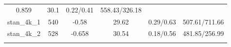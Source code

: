 \documentclass[]{article}
\begin{document}
\begin{longtable}[]{@{}cccccc@{}}
\begin{minipage}[t]{0.12\columnwidth}
0.859\strut
\end{minipage} & \begin{minipage}[t]{0.14\columnwidth}\centering\strut
30.1\strut
\end{minipage} & \begin{minipage}[t]{0.17\columnwidth}\centering\strut
0.22/0.41\strut
\end{minipage} & \begin{minipage}[t]{0.22\columnwidth}\centering\strut
558.43/326.18\strut
\end{minipage}\tabularnewline
\begin{minipage}[t]{0.12\columnwidth}\centering\strut
stan\_4k\_1\strut
\end{minipage} & \begin{minipage}[t]{0.07\columnwidth}\centering\strut
540\strut
\end{minipage} & \begin{minipage}[t]{0.12\columnwidth}\centering\strut
-0.58\strut
\end{minipage} & \begin{minipage}[t]{0.14\columnwidth}\centering\strut
29.62\strut
\end{minipage} & \begin{minipage}[t]{0.17\columnwidth}\centering\strut
0.29/0.63\strut
\end{minipage} & \begin{minipage}[t]{0.22\columnwidth}\centering\strut
507.61/711.66\strut
\end{minipage}\tabularnewline
\begin{minipage}[t]{0.12\columnwidth}\centering\strut
stan\_4k\_2\strut
\end{minipage} & \begin{minipage}[t]{0.07\columnwidth}\centering\strut
528\strut
\end{minipage} & \begin{minipage}[t]{0.12\columnwidth}\centering\strut
-0.658\strut
\end{minipage} & \begin{minipage}[t]{0.14\columnwidth}\centering\strut
30.54\strut
\end{minipage} & \begin{minipage}[t]{0.17\columnwidth}\centering\strut
0.18/0.56\strut
\end{minipage} & \begin{minipage}[t]{0.22\columnwidth}\centering\strut
481.85/256.99\strut
\end{minipage}\tabularnewline
\begin{minipage}[t]{0.12\columnwidth}\centering\strut

\end{minipage}
\end{longtable}
\end{document}
